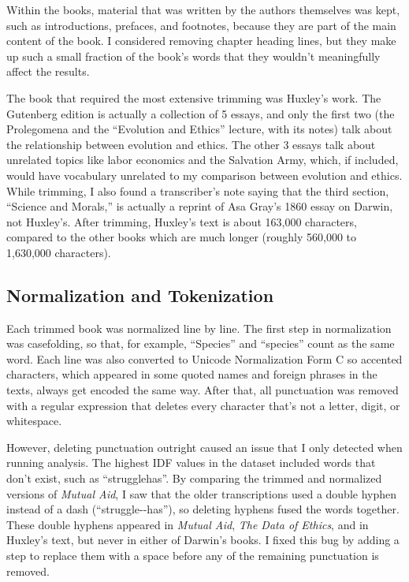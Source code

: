 \documentclass[11pt]{article}
\begin{document}
Within the books, material that was written by the authors themselves was kept, such as introductions, prefaces, and footnotes, because they are part of the main content of the book.
I considered removing chapter heading lines, but they make up such a small fraction of the book's words that they wouldn't meaningfully affect the results.

The book that required the most extensive trimming was Huxley's work.
The Gutenberg edition is actually a collection of 5 essays, and only the first two (the Prolegomena and the ``Evolution and Ethics'' lecture, with its notes) talk about the relationship between evolution and ethics.
The other 3 essays talk about unrelated topics like labor economics and the Salvation Army, which, if included, would have vocabulary unrelated to my comparison between evolution and ethics.
While trimming, I also found a transcriber's note saying that the third section, ``Science and Morals,'' is actually a reprint of Asa Gray's 1860 essay on Darwin, not Huxley's.
After trimming, Huxley's text is about 163,000 characters, compared to the other books which are much longer (roughly 560,000 to 1,630,000 characters).

\subsection{Normalization and Tokenization}
\label{sec:normalization}
Each trimmed book was normalized line by line. The first step in normalization was casefolding, so that, for example, ``Species'' and ``species'' count as the same word.
Each line was also converted to Unicode Normalization Form C so accented characters, which appeared in some quoted names and foreign phrases in the texts, always get encoded the same way.
After that, all punctuation was removed with a regular expression that deletes every character that's not a letter, digit, or whitespace.

However, deleting punctuation outright caused an issue that I only detected when running analysis. The highest IDF values in the dataset included words that don't exist, such as ``strugglehas''.
By comparing the trimmed and normalized versions of \emph{Mutual Aid}, I saw that the older transcriptions used a double hyphen instead of a dash (``struggle-{}-has''), so deleting hyphens fused the words together.
These double hyphens appeared in \emph{Mutual Aid}, \emph{The Data of Ethics}, and in Huxley's text, but never in either of Darwin's books.
I fixed this bug by adding a step to replace them with a space before any of the remaining punctuation is removed.
\end{document}
